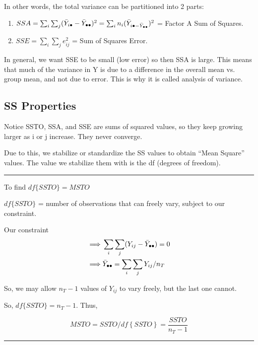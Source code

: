 \documentclass[10pt]{article}
\newcommand{\define}[1]{\colorbox{Thistle2}{#1}}
\newcommand{\emphas}[1]{\colorbox{DarkSeaGreen2}{#1}}
\newcommand{\drawline}{\noindent\rule{\linewidth}{0.1pt}}
\begin{document}
\begin{multicols}{3}
    In other words, the total variance can be partitioned into 2 parts:

    \begin{enumerate}
        \item $SSA = \sum_i \sum_j (\bar Y_{i\bullet} - \bar Y_{\bullet\bullet})^2 = \sum_i n_i (\bar Y_{i\bullet - \bar Y_{\bullet\bullet}})^2$ = \define{Factor A Sum of Squares}.
        \item $SSE = \sum_i \sum_j e_{ij}^2$ = \define{Sum of Squares Error}.
    \end{enumerate}

    In general, we want SSE to be small (low error) so then SSA is large. This means that much of the variance in Y is due to a difference in the overall mean vs. group mean, and not due to error. This is why it is called analysis of variance.

    \subsection{SS Properties}

    Notice SSTO, SSA, and SSE are sums of squared values, so they keep growing larger as i or j increase. They never converge.

    Due to this, we \emphas{stabilize or standardize} the SS values to obtain \define{``Mean Square''} values. The value we stabilize them with is the df (degrees of freedom).

    \drawline

    To find $df\{SSTO\} = MSTO$

    $df\{SSTO\}$ = number of observations that can freely vary, subject to our constraint.

    Our constraint 
    \begin{align*}
        \implies & \sum_i \sum_j (Y_{ij} - \bar Y_{\bullet\bullet}) = 0 \\
        \implies & \bar Y_{\bullet\bullet} = \sum_i \sum_j Y_{ij}/n_T 
    \end{align*}

    So, we may allow $n_T - 1$ values of $Y_{ij}$ to vary freely, but the last one cannot.

    So, $df\{SSTO\} = n_T - 1$. Thus,

    \newcommand{\df}[1]{df\left\{#1\right\}}
    \begin{equation*}
        MSTO = SSTO/\df{SSTO} = \frac{SSTO}{n_T-1}
    \end{equation*}

    \drawline


\end{multicols}
\end{document}
